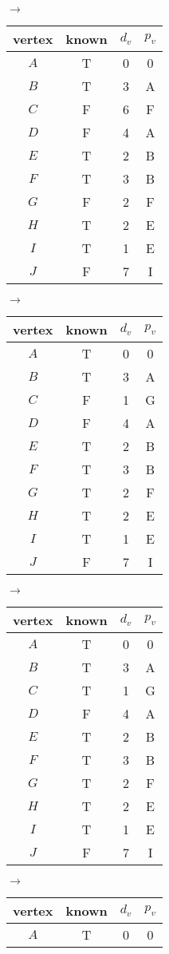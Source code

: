 \documentclass[12pt]{article}
\begin{document}
\begin{center}
$\rightarrow$
\begin{tabular}{ c c c c } 
vertex & known & $d_v$ & $p_v$ \\
 \hline
$A$ & T & 0 & 0 \\
$B$ & T & 3 & A \\
$C$ & F & 6 & F \\
$D$ & F & 4 & A \\
$E$ & T & 2 & B \\
$F$ & T & 3 & B \\
$G$ & F & 2 & F \\
$H$ & T & 2 & E \\
$I$ & T & 1 & E \\
$J$ & F & 7 & I \\
\end{tabular}
$\rightarrow$
\begin{tabular}{ c c c c } 
vertex & known & $d_v$ & $p_v$ \\
 \hline
$A$ & T & 0 & 0 \\
$B$ & T & 3 & A \\
$C$ & F & 1 & G \\
$D$ & F & 4 & A \\
$E$ & T & 2 & B \\
$F$ & T & 3 & B \\
$G$ & T & 2 & F \\
$H$ & T & 2 & E \\
$I$ & T & 1 & E \\
$J$ & F & 7 & I \\
\end{tabular}
$\rightarrow$
\begin{tabular}{ c c c c } 
vertex & known & $d_v$ & $p_v$ \\
 \hline
$A$ & T & 0 & 0 \\
$B$ & T & 3 & A \\
$C$ & T & 1 & G \\
$D$ & F & 4 & A \\
$E$ & T & 2 & B \\
$F$ & T & 3 & B \\
$G$ & T & 2 & F \\
$H$ & T & 2 & E \\
$I$ & T & 1 & E \\
$J$ & F & 7 & I \\
\end{tabular}
$\rightarrow$
\begin{tabular}{ c c c c } 
vertex & known & $d_v$ & $p_v$ \\
 \hline
$A$ & T & 0 & 0 \\

\end{tabular}
\end{center}
\end{document}

